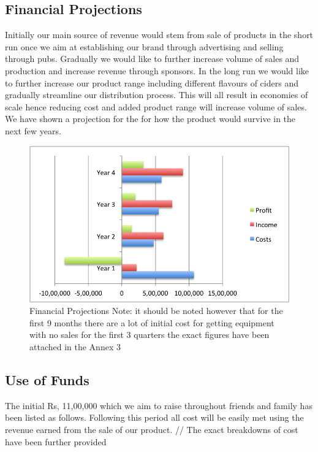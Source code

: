 \documentclass[11pt]{article}
\begin{document}
  \subsection{Financial Projections}
Initially our main source of revenue would stem from sale of products in the short run once we aim at establishing our brand through advertising and selling through pubs. Gradually we would like to further increase volume of sales and production and increase revenue through sponsors. In the long run we would like to further increase our product range including different flavours of ciders and gradually streamline our distribution process. This will all result in economies of scale hence reducing cost and added product range will increase volume of sales. We have shown a projection for the for how the product would survive in the next few years.
	\begin{figure}[h!]
	\caption{Financial Projections \n Note: it should be noted however that for the first 9 months there are a lot of initial cost for getting equipment with no sales for the first 3 quarters \n the exact figures have been attached in the Annex 3}
	\centering
	\includegraphics[width=\textwidth]{financial_projections.png}
	\end{figure}


  \subsection{Use of Funds}
The initial Rs, 11,00,000 which we aim to raise throughout friends and family has been listed as follows. 
Following this period all cost will be easily met using the revenue earned from the sale of our product. //
The exact breakdowns of cost have been further provided
\end{document}
